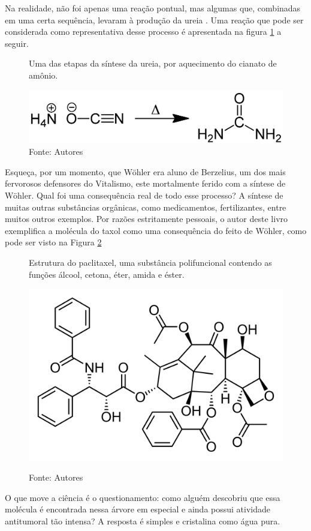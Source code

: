\documentclass[a4paper,12pt,]{book}
\begin{document}
Na realidade, não foi apenas uma reação pontual, mas algumas que, combinadas em uma certa sequência, levaram à produção da ureia . Uma reação que pode ser considerada como representativa desse processo é apresentada na figura \ref{fig:ureia} a seguir.

\begin{figure}[h]
	\centering
	\vspace{0.5cm}
	\caption{Uma das etapas da síntese da ureia, por aquecimento do cianato de amônio.}
	\label{fig:ureia}
	\includegraphics[width=0.7\linewidth]{imagens/Urea_Synthesis_Woehler.png}
	\caption*{Fonte: Autores}
\end{figure}

Esqueça, por um momento, que Wöhler era aluno de Berzelius, um dos mais fervorosos defensores do Vitalismo, este mortalmente ferido com a síntese de Wöhler. Qual foi uma consequência real de todo esse processo? A síntese de muitas outras substâncias orgânicas, como medicamentos, fertilizantes, entre muitos outros exemplos. Por razões estritamente pessoais, o autor deste livro exemplifica a molécula do taxol  como uma consequência do feito de Wöhler, como pode ser visto na Figura \ref{fig:taxol}

\begin{figure}[h]
	\centering
	\caption{Estrutura do paclitaxel, uma substância polifuncional contendo as funções álcool, cetona, éter, amida e éster.}
	\includegraphics[width=0.5\linewidth]{imagens/Taxol.svg.png} 
	\label{fig:taxol}
	\caption*{Fonte: Autores}
\end{figure}


O que move a ciência é o questionamento: como alguém descobriu que essa molécula é encontrada nessa árvore em especial e ainda possui atividade antitumoral tão intensa? A resposta é simples e cristalina como água pura.
\end{document}
